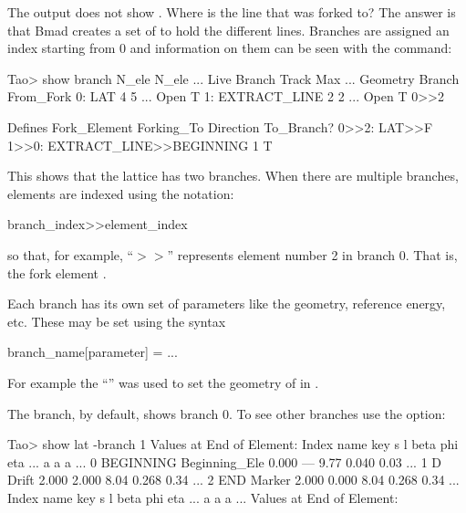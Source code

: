 \documentclass{hitec}     %
\begin{document}
The  output does not show . Where is the line that was forked to? The answer is
that Bmad creates a set of  to hold the different lines. Branches are assigned an index
starting from 0 and information on them can be seen with the  command:
\begin{code}
Tao> show branch
                    N_ele  N_ele   ...              Live
  Branch            Track    Max   ...    Geometry  Branch  From_Fork
  0: LAT                4      5   ...    Open       T
  1: EXTRACT_LINE       2      2   ...    Open       T      0>>2
 
                                                                    Defines
  Fork_Element      Forking_To                         Direction    To_Branch?
  0>>2: LAT>>F      1>>0: EXTRACT_LINE>>BEGINNING        1             T
\end{code}  
This shows that the lattice has two branches. When there are multiple branches, elements
are indexed using the notation:
\begin{code}
branch_index>>element_index
\end{code}
so that, for example, ``$>>$'' represents element number 2 in branch 0. That is, the
fork element . 

Each branch has its own set of parameters like the geometry, reference energy, etc. These may be set
using the syntax
\begin{code}
  branch_name[parameter] = ...
\end{code}
For example the ``'' was used to set the geometry of  in
.

The  branch, by default, shows branch 0. To see other branches use the  option:
\begin{code}
Tao> show lat -branch 1
      Values at End of Element:
 Index  name      key                     s       l    beta     phi    eta ...
                                                          a       a      a ...
     0  BEGINNING Beginning_Ele       0.000     ---    9.77   0.040   0.03 ...
     1  D         Drift               2.000   2.000    8.04   0.268   0.34 ...
     2  END       Marker              2.000   0.000    8.04   0.268   0.34 ...
 Index  name      key                     s       l    beta     phi    eta ...
                                                          a       a      a ...
      Values at End of Element:
\end{code}
\end{document}
